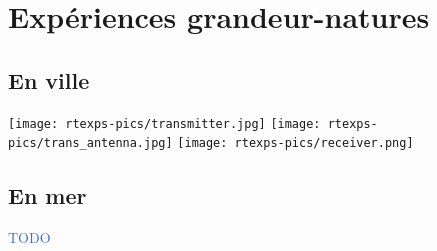 \documentclass[../main.tex]{subfiles}
\begin{document}
\section{Expériences grandeur-natures}

\subsection{En ville}

\begin{frame}{\subsecname}
  \texttt{[image: rtexps-pics/transmitter.jpg]}
  \texttt{[image: rtexps-pics/trans\_antenna.jpg]}
  \texttt{[image: rtexps-pics/receiver.png]}
\end{frame}

\subsection{En mer}

\begin{frame}{\subsecname}
  \begin{center}
    \textcolor{RoyalBlue}{TODO}
  \end{center}
\end{frame}
\end{document}
